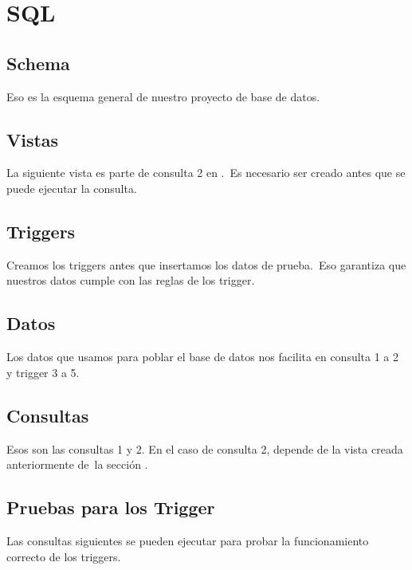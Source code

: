 \documentclass[12pt]{article}
\begin{document}
\newpage
\section{SQL}
\label{sec:sql}
\subsection{Schema}
\label{sec:schema}
Eso es la esquema general de nuestro proyecto de base de datos.\\


\newpage
\subsection{Vistas}
\label{sec:vistas}
La siguiente vista es parte de consulta 2 en .\
Es necesario ser creado antes que se puede ejecutar la consulta.\\


\newpage
\subsection{Triggers}
\label{sec:triggers}
Creamos los triggers antes que insertamos los datos de prueba.\
Eso garantiza que nuestros datos cumple con las reglas de los trigger.\\


\newpage
\subsection{Datos}
\label{sec:datos}
Los datos que usamos para poblar el base de datos nos facilita en consulta 1 a 2 y trigger 3 a 5.


\newpage
\subsection{Consultas}
\label{sec:consultas}
Esos son las consultas 1 y 2. En el caso de consulta 2, depende de la vista creada anteriormente de\
la sección .


\newpage
\subsection{Pruebas para los Trigger}
\label{sec:pruebas}
Las consultas siguientes se pueden ejecutar para probar la funcionamiento correcto de los triggers.\\

\end{document}
